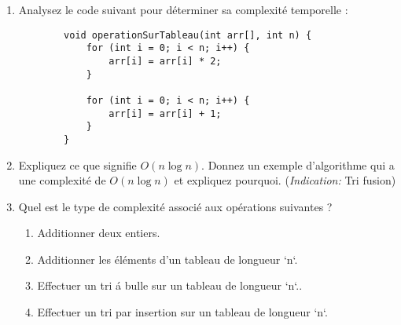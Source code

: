 \begin{enumerate}
	\item Analysez le code suivant pour déterminer sa complexité temporelle :
	\begin{lstlisting}
		void operationSurTableau(int arr[], int n) {
			for (int i = 0; i < n; i++) {
				arr[i] = arr[i] * 2;
			}
			
			for (int i = 0; i < n; i++) {
				arr[i] = arr[i] + 1;
			}
		}
	\end{lstlisting}
	
	\item Expliquez ce que signifie $O(n \log n)$. Donnez un exemple d'algorithme qui a une complexité de $O(n \log n)$ et expliquez pourquoi. (\textit{Indication:} Tri fusion)
	
	\item Quel est le type de complexité associé aux opérations suivantes ?
	\begin{enumerate}
		\item Additionner deux entiers.
		\item Additionner les éléments d'un tableau de longueur `n`.
		\item Effectuer un tri \'a bulle sur un tableau de longueur `n`..
		\item Effectuer un tri par insertion sur un tableau de longueur `n`.
	\end{enumerate}
\end{enumerate}




